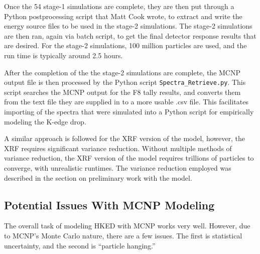 Once the 54 stage-1 simulations are complete, they are then put through a Python postprocessing script that Matt Cook wrote, to extract and write the energy source files to be used in the stage-2 simulations. The stage-2 simulations are then ran, again via batch script, to get the final detector response results that are desired. For the stage-2 simulations, 100 million particles are used, and the run time is typically around 2.5 hours. 

After the completion of the the stage-2 simulations are complete, the MCNP output file is then processed by the Python script \texttt{Spectra\_Retrieve.py}. This script searches the MCNP output for the F8 tally results, and converts them from the text file they are supplied in to a more usable .csv file. This facilitates importing of the spectra that were simulated into a Python script for empirically modeling the K-edge drop. 

A similar approach is followed for the XRF version of the model, however, the XRF requires significant variance reduction. Without multiple methods of variance reduction, the XRF version of the model requires trillions of particles to converge, with unrealistic runtimes. The variance reduction employed was described in the section on preliminary work with the model. 

\subsection{Potential Issues With MCNP Modeling}

The overall task of modeling HKED with MCNP works very well. However, due to MCNP's Monte Carlo nature, there are a few issues. The first is statistical uncertainty, and the second is ``particle hanging.'' %

